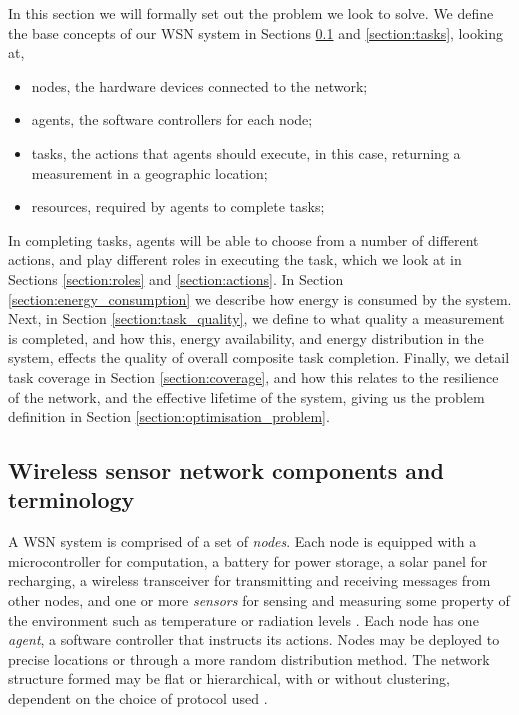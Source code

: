 
In this section we will formally set out the problem we look to solve. We define the base concepts of our WSN system in Sections \ref{section:terminology} and \ref{section:tasks}, looking at,
\begin{itemize}
	\item nodes, the hardware devices connected to the network;
	\item agents, the software controllers for each node;
	\item tasks, the actions that agents should execute, in this case, returning a measurement in a geographic location;
	\item resources, required by agents to complete tasks; 
\end{itemize}
In completing tasks, agents will be able to choose from a number of different actions, and play different roles in executing the task, which we look at in Sections \ref{section:roles} and \ref{section:actions}. In Section \ref{section:energy_consumption} we describe how energy is consumed by the system. Next, in Section \ref{section:task_quality}, we define to what quality a measurement is completed, and how this, energy availability, and energy distribution in the system, effects the quality of overall composite task completion. Finally, we detail task coverage in Section \ref{section:coverage}, and how this relates to the resilience of the network, and the effective lifetime of the system, giving us the problem definition in Section \ref{section:optimisation_problem}.

\subsection{Wireless sensor network components and terminology}
\label{section:terminology}

A WSN system is comprised of a set of \textit{nodes}. Each node is equipped with a microcontroller for computation, a battery for power storage, a solar panel for recharging, a wireless transceiver for  transmitting and receiving messages from other nodes, and one or more \textit{sensors} for sensing and measuring some property of the environment such as temperature or radiation levels \citep{muhammad_r_ahmed_2012_1072589}. Each node has one \textit{agent}, a software controller that instructs its actions. Nodes may be deployed to precise locations or through a more random distribution method. The network structure formed may be flat or hierarchical, with or without clustering, dependent on the choice of protocol used \citep{Carlos-Mancilla2016b}. 

